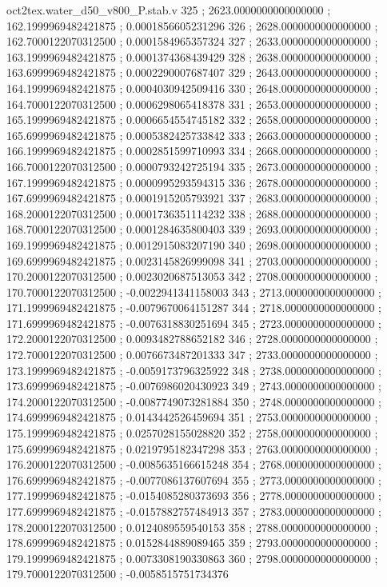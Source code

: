 \begin{filecontents}[overwrite]{oct2tex.water_d50_v800_P.stab.v}
325 ; 2623.0000000000000000 ; 162.1999969482421875 ; 0.0001856605231296
326 ; 2628.0000000000000000 ; 162.7000122070312500 ; 0.0001584965357324
327 ; 2633.0000000000000000 ; 163.1999969482421875 ; 0.0001374368439429
328 ; 2638.0000000000000000 ; 163.6999969482421875 ; 0.0002290007687407
329 ; 2643.0000000000000000 ; 164.1999969482421875 ; 0.0004030942509416
330 ; 2648.0000000000000000 ; 164.7000122070312500 ; 0.0006298065418378
331 ; 2653.0000000000000000 ; 165.1999969482421875 ; 0.0006654554745182
332 ; 2658.0000000000000000 ; 165.6999969482421875 ; 0.0005382425733842
333 ; 2663.0000000000000000 ; 166.1999969482421875 ; 0.0002851599710993
334 ; 2668.0000000000000000 ; 166.7000122070312500 ; 0.0000793242725194
335 ; 2673.0000000000000000 ; 167.1999969482421875 ; 0.0000995293594315
336 ; 2678.0000000000000000 ; 167.6999969482421875 ; 0.0001915205793921
337 ; 2683.0000000000000000 ; 168.2000122070312500 ; 0.0001736351114232
338 ; 2688.0000000000000000 ; 168.7000122070312500 ; 0.0001284635800403
339 ; 2693.0000000000000000 ; 169.1999969482421875 ; 0.0012915083207190
340 ; 2698.0000000000000000 ; 169.6999969482421875 ; 0.0023145826999098
341 ; 2703.0000000000000000 ; 170.2000122070312500 ; 0.0023020687513053
342 ; 2708.0000000000000000 ; 170.7000122070312500 ; -0.0022941341158003
343 ; 2713.0000000000000000 ; 171.1999969482421875 ; -0.0079670064151287
344 ; 2718.0000000000000000 ; 171.6999969482421875 ; -0.0076318830251694
345 ; 2723.0000000000000000 ; 172.2000122070312500 ; 0.0093482788652182
346 ; 2728.0000000000000000 ; 172.7000122070312500 ; 0.0076673487201333
347 ; 2733.0000000000000000 ; 173.1999969482421875 ; -0.0059173796325922
348 ; 2738.0000000000000000 ; 173.6999969482421875 ; -0.0076986020430923
349 ; 2743.0000000000000000 ; 174.2000122070312500 ; -0.0087749073281884
350 ; 2748.0000000000000000 ; 174.6999969482421875 ; 0.0143442526459694
351 ; 2753.0000000000000000 ; 175.1999969482421875 ; 0.0257028155028820
352 ; 2758.0000000000000000 ; 175.6999969482421875 ; 0.0219795182347298
353 ; 2763.0000000000000000 ; 176.2000122070312500 ; -0.0085635166615248
354 ; 2768.0000000000000000 ; 176.6999969482421875 ; -0.0077086137607694
355 ; 2773.0000000000000000 ; 177.1999969482421875 ; -0.0154085280373693
356 ; 2778.0000000000000000 ; 177.6999969482421875 ; -0.0157882757484913
357 ; 2783.0000000000000000 ; 178.2000122070312500 ; 0.0124089559540153
358 ; 2788.0000000000000000 ; 178.6999969482421875 ; 0.0152844889089465
359 ; 2793.0000000000000000 ; 179.1999969482421875 ; 0.0073308190330863
360 ; 2798.0000000000000000 ; 179.7000122070312500 ; -0.0058515751734376

\end{filecontents}
